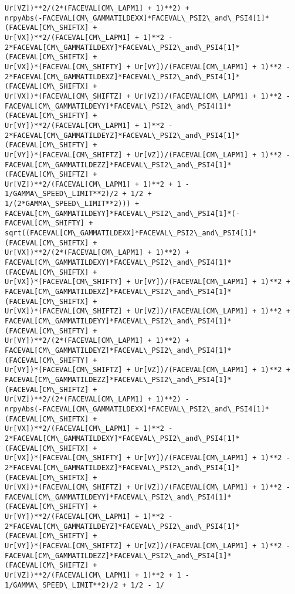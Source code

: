 \documentclass[landscape,letterpaper,10pt,english]{article}
\begin{document}
\begin{Verbatim}[commandchars=\\\{\}]
Ur[VZ])**2/(2*(FACEVAL[CM\_LAPM1] + 1)**2) +
nrpyAbs(-FACEVAL[CM\_GAMMATILDEXX]*FACEVAL\_PSI2\_and\_PSI4[1]*(FACEVAL[CM\_SHIFTX] +
Ur[VX])**2/(FACEVAL[CM\_LAPM1] + 1)**2 -
2*FACEVAL[CM\_GAMMATILDEXY]*FACEVAL\_PSI2\_and\_PSI4[1]*(FACEVAL[CM\_SHIFTX] +
Ur[VX])*(FACEVAL[CM\_SHIFTY] + Ur[VY])/(FACEVAL[CM\_LAPM1] + 1)**2 -
2*FACEVAL[CM\_GAMMATILDEXZ]*FACEVAL\_PSI2\_and\_PSI4[1]*(FACEVAL[CM\_SHIFTX] +
Ur[VX])*(FACEVAL[CM\_SHIFTZ] + Ur[VZ])/(FACEVAL[CM\_LAPM1] + 1)**2 -
FACEVAL[CM\_GAMMATILDEYY]*FACEVAL\_PSI2\_and\_PSI4[1]*(FACEVAL[CM\_SHIFTY] +
Ur[VY])**2/(FACEVAL[CM\_LAPM1] + 1)**2 -
2*FACEVAL[CM\_GAMMATILDEYZ]*FACEVAL\_PSI2\_and\_PSI4[1]*(FACEVAL[CM\_SHIFTY] +
Ur[VY])*(FACEVAL[CM\_SHIFTZ] + Ur[VZ])/(FACEVAL[CM\_LAPM1] + 1)**2 -
FACEVAL[CM\_GAMMATILDEZZ]*FACEVAL\_PSI2\_and\_PSI4[1]*(FACEVAL[CM\_SHIFTZ] +
Ur[VZ])**2/(FACEVAL[CM\_LAPM1] + 1)**2 + 1 - 1/GAMMA\_SPEED\_LIMIT**2)/2 + 1/2 +
1/(2*GAMMA\_SPEED\_LIMIT**2))) +
FACEVAL[CM\_GAMMATILDEYY]*FACEVAL\_PSI2\_and\_PSI4[1]*(-FACEVAL[CM\_SHIFTY] +
sqrt((FACEVAL[CM\_GAMMATILDEXX]*FACEVAL\_PSI2\_and\_PSI4[1]*(FACEVAL[CM\_SHIFTX] +
Ur[VX])**2/(2*(FACEVAL[CM\_LAPM1] + 1)**2) +
FACEVAL[CM\_GAMMATILDEXY]*FACEVAL\_PSI2\_and\_PSI4[1]*(FACEVAL[CM\_SHIFTX] +
Ur[VX])*(FACEVAL[CM\_SHIFTY] + Ur[VY])/(FACEVAL[CM\_LAPM1] + 1)**2 +
FACEVAL[CM\_GAMMATILDEXZ]*FACEVAL\_PSI2\_and\_PSI4[1]*(FACEVAL[CM\_SHIFTX] +
Ur[VX])*(FACEVAL[CM\_SHIFTZ] + Ur[VZ])/(FACEVAL[CM\_LAPM1] + 1)**2 +
FACEVAL[CM\_GAMMATILDEYY]*FACEVAL\_PSI2\_and\_PSI4[1]*(FACEVAL[CM\_SHIFTY] +
Ur[VY])**2/(2*(FACEVAL[CM\_LAPM1] + 1)**2) +
FACEVAL[CM\_GAMMATILDEYZ]*FACEVAL\_PSI2\_and\_PSI4[1]*(FACEVAL[CM\_SHIFTY] +
Ur[VY])*(FACEVAL[CM\_SHIFTZ] + Ur[VZ])/(FACEVAL[CM\_LAPM1] + 1)**2 +
FACEVAL[CM\_GAMMATILDEZZ]*FACEVAL\_PSI2\_and\_PSI4[1]*(FACEVAL[CM\_SHIFTZ] +
Ur[VZ])**2/(2*(FACEVAL[CM\_LAPM1] + 1)**2) -
nrpyAbs(-FACEVAL[CM\_GAMMATILDEXX]*FACEVAL\_PSI2\_and\_PSI4[1]*(FACEVAL[CM\_SHIFTX] +
Ur[VX])**2/(FACEVAL[CM\_LAPM1] + 1)**2 -
2*FACEVAL[CM\_GAMMATILDEXY]*FACEVAL\_PSI2\_and\_PSI4[1]*(FACEVAL[CM\_SHIFTX] +
Ur[VX])*(FACEVAL[CM\_SHIFTY] + Ur[VY])/(FACEVAL[CM\_LAPM1] + 1)**2 -
2*FACEVAL[CM\_GAMMATILDEXZ]*FACEVAL\_PSI2\_and\_PSI4[1]*(FACEVAL[CM\_SHIFTX] +
Ur[VX])*(FACEVAL[CM\_SHIFTZ] + Ur[VZ])/(FACEVAL[CM\_LAPM1] + 1)**2 -
FACEVAL[CM\_GAMMATILDEYY]*FACEVAL\_PSI2\_and\_PSI4[1]*(FACEVAL[CM\_SHIFTY] +
Ur[VY])**2/(FACEVAL[CM\_LAPM1] + 1)**2 -
2*FACEVAL[CM\_GAMMATILDEYZ]*FACEVAL\_PSI2\_and\_PSI4[1]*(FACEVAL[CM\_SHIFTY] +
Ur[VY])*(FACEVAL[CM\_SHIFTZ] + Ur[VZ])/(FACEVAL[CM\_LAPM1] + 1)**2 -
FACEVAL[CM\_GAMMATILDEZZ]*FACEVAL\_PSI2\_and\_PSI4[1]*(FACEVAL[CM\_SHIFTZ] +
Ur[VZ])**2/(FACEVAL[CM\_LAPM1] + 1)**2 + 1 - 1/GAMMA\_SPEED\_LIMIT**2)/2 + 1/2 - 1/

\end{Verbatim}
\end{document}
